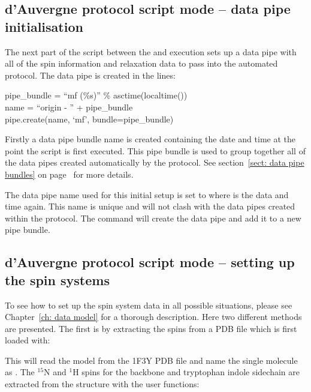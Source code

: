 \begin{htmlonly}
\begin{htmlonly}

\subsection{d'Auvergne protocol script mode -- data pipe initialisation}

The next part of the script between the  and execution sets up a data pipe with all of the spin information and relaxation data to pass into the automated protocol.  The data pipe is created in the lines:

\begin{exampleenv}
pipe\_bundle = ``mf (\%s)'' \% asctime(localtime()) \\
name = ``origin - '' + pipe\_bundle \\
pipe.create(name, `mf', bundle=pipe\_bundle)
\end{exampleenv}

Firstly a data pipe bundle name is created containing the date and time at the point the script is first executed.  This pipe bundle is used to group together all of the data pipes created automatically by the protocol.  See section~\ref{sect: data pipe bundles} on page~\pageref{sect: data pipe bundles} for more details.

The data pipe name used for this initial setup is set to  where  is the data and time again.  This name is unique and will not clash with the data pipes created within the protocol.  The  command will create the data pipe and add it to a new pipe bundle.



\subsection{d'Auvergne protocol script mode -- setting up the spin systems}

To see how to set up the spin system data in all possible situations, please see Chapter~\ref{ch: data model} for a thorough description.  Here two different methods are presented.  The first is by extracting the spins from a PDB file which is first loaded with:


This will read the  model from the 1F3Y PDB file and name the single molecule as .  The $^{15}$N and $^1$H spins for the backbone and tryptophan indole sidechain are extracted from the structure with the user functions:


\end{htmlonly}
\end{htmlonly}
